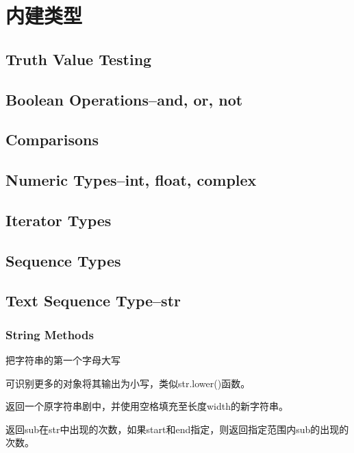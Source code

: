 \chapter{内建类型}
\section{Truth Value Testing}
\section{Boolean Operations--and, or, not}
\section{Comparisons}
\section{Numeric Types--int, float, complex}
\section{Iterator Types}
\section{Sequence Types}
\section{Text Sequence Type--str}
\subsection{String Methods}
\noindent{\color{red}{str.capitalize():}}
\par{把字符串的第一个字母大写}\\

\noindent{\color{red}{str.casefold():}}
\par{可识别更多的对象将其输出为小写，类似str.lower()函数。}\\

\noindent{\color{red}{str.center(width[, fillchar]):}}
\par{返回一个原字符串剧中，并使用空格填充至长度width的新字符串。}\\

\noindent{\color{red}{str.count(sub[, start[, end]]):}}
\par{返回sub在str中出现的次数，如果start和end指定，则返回指定范围内sub的出现的次数。}\\

